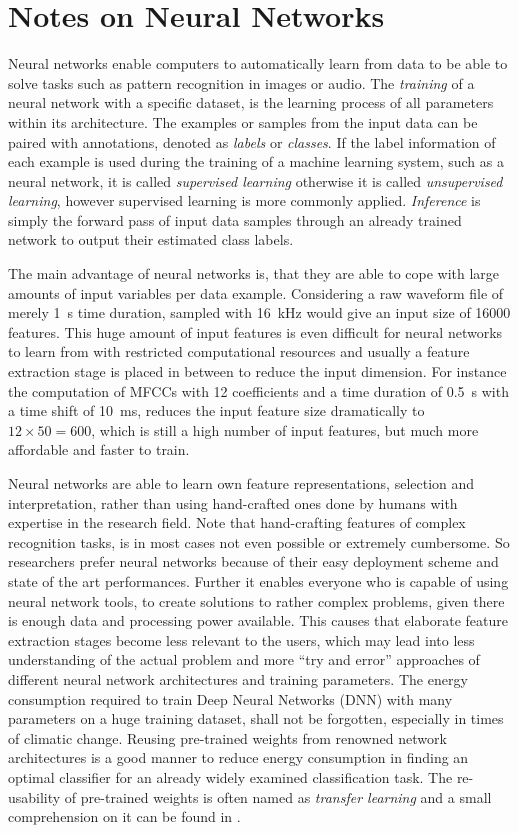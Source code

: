 
\section{Notes on Neural Networks}\label{sec:intro_nn}
Neural networks enable computers to automatically learn from data to be able to solve tasks such as pattern recognition in images or audio.
The \emph{training} of a neural network with a specific dataset, is the learning process of all parameters within its architecture.
The examples or samples from the input data can be paired with annotations, denoted as \emph{labels} or \emph{classes}.
If the label information of each example is used during the training of a machine learning system, such as a neural network, it is called \emph{supervised learning} otherwise it is called \emph{unsupervised learning}, however supervised learning is more commonly applied.
\emph{Inference} is simply the forward pass of input data samples through an already trained network to output their estimated class labels.

The main advantage of neural networks is, that they are able to cope with large amounts of input variables per data example.
Considering a raw waveform file of merely \SI{1}{s} time duration, sampled with \SI{16}{\kilo\hertz} would give an input size of 16000 features.
This huge amount of input features is even difficult for neural networks to learn from with restricted computational resources and usually a feature extraction stage is placed in between to reduce the input dimension.
For instance the computation of MFCCs with 12 coefficients and a time duration of \SI{0.5}{s} with a time shift of \SI{10}{\milli\second}, reduces the input feature size dramatically to $12 \times 50 = 600$, which is still a high number of input features, but much more affordable and faster to train.

Neural networks are able to learn own feature representations, selection and interpretation, rather than using hand-crafted ones done by humans with expertise in the research field.
Note that hand-crafting features of complex recognition tasks, is in most cases not even possible or extremely cumbersome.
So researchers prefer neural networks because of their easy deployment scheme and state of the art performances.
Further it enables everyone who is capable of using neural network tools, to create solutions to rather complex problems, given there is enough data and processing power available.
This causes that elaborate feature extraction stages become less relevant to the users, which may lead into less understanding of the actual problem and more \enquote{try and error} approaches of different neural network architectures and training parameters.
The energy consumption required to train Deep Neural Networks (DNN) with many parameters on a huge training dataset, shall not be forgotten, especially in times of climatic change.
Reusing pre-trained weights from renowned network architectures is a good manner to reduce energy consumption in finding an optimal classifier for an already widely examined classification task.
The re-usability of pre-trained weights is often named as \emph{transfer learning} and a small comprehension on it can be found in \cite{TransferLearning}.

